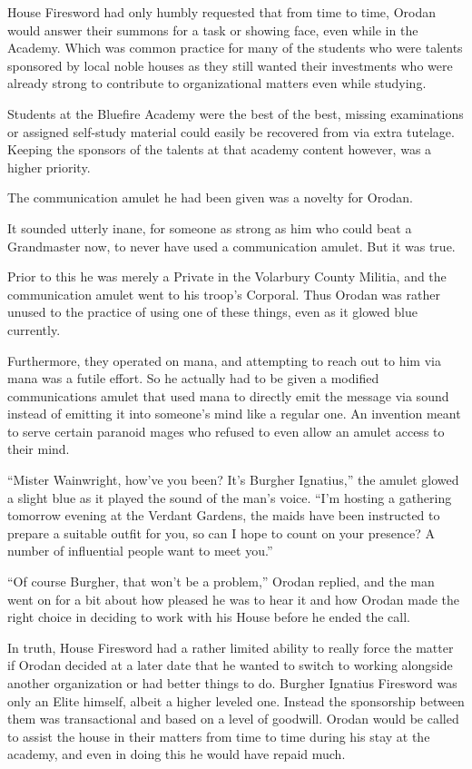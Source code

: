 \documentclass[a4paper,10pt]{book}
\begin{document}
House Firesword had only humbly requested that from time to time, Orodan would answer their summons for a task or showing face, even while in the Academy. Which was common practice for many of the students who were talents sponsored by local noble houses as they still wanted their investments who were already strong to contribute to organizational matters even while studying.\par
Students at the Bluefire Academy were the best of the best, missing examinations or assigned self-study material could easily be recovered from via extra tutelage. Keeping the sponsors of the talents at that academy content however, was a higher priority.\par
The communication amulet he had been given was a novelty for Orodan.\par
It sounded utterly inane, for someone as strong as him who could beat a Grandmaster now, to never have used a communication amulet. But it was true.\par
Prior to this he was merely a Private in the Volarbury County Militia, and the communication amulet went to his troop’s Corporal. Thus Orodan was rather unused to the practice of using one of these things, even as it glowed blue currently.\par
Furthermore, they operated on mana, and attempting to reach out to him via mana was a futile effort. So he actually had to be given a modified communications amulet that used mana to directly emit the message via sound instead of emitting it into someone’s mind like a regular one. An invention meant to serve certain paranoid mages who refused to even allow an amulet access to their mind.\par
“Mister Wainwright, how’ve you been? It’s Burgher Ignatius,” the amulet glowed a slight blue as it played the sound of the man’s voice. “I’m hosting a gathering tomorrow evening at the Verdant Gardens, the maids have been instructed to prepare a suitable outfit for you, so can I hope to count on your presence? A number of influential people want to meet you.”\par
“Of course Burgher, that won’t be a problem,” Orodan replied, and the man went on for a bit about how pleased he was to hear it and how Orodan made the right choice in deciding to work with his House before he ended the call.\par
In truth, House Firesword had a rather limited ability to really force the matter if Orodan decided at a later date that he wanted to switch to working alongside another organization or had better things to do. Burgher Ignatius Firesword was only an Elite himself, albeit a higher leveled one. Instead the sponsorship between them was transactional and based on a level of goodwill. Orodan would be called to assist the house in their matters from time to time during his stay at the academy, and even in doing this he would have repaid much.\par
\end{document}
